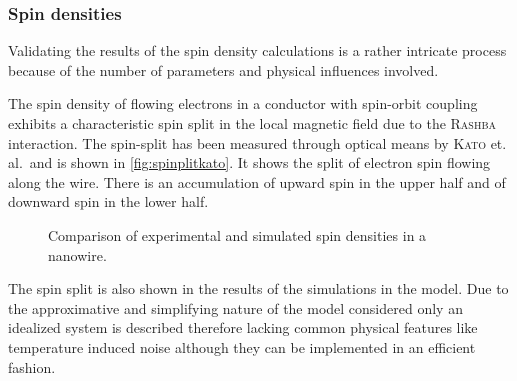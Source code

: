\subsubsection{Spin densities}
Validating the results of the spin density calculations is a rather intricate process because of the number of parameters and physical influences involved.\par
The spin density of flowing electrons in a conductor with spin-orbit coupling exhibits a characteristic spin split in the local magnetic field due to the \textsc{Rashba} interaction. The spin-split has been measured through optical means by \textsc{Kato} et. al.\,\cite{Kato2004Science} and is shown in \cref{fig:spinplitkato}. It shows the split of electron spin flowing along the wire. There is an accumulation of upward spin in the upper half and of downward spin in the lower half.
\begin{figure}[h]
  \begin{center}
    \qquad
    \qquad
    \caption{Comparison of experimental and simulated spin densities in a nanowire.}
  \end{center}
\end{figure}
The spin split is also shown in the results of the simulations in the \gfnc{} model. Due to the approximative and simplifying nature of the model considered only an idealized system is described therefore lacking common physical features like temperature induced noise although they can be implemented in an efficient fashion.\par
\FloatBarrier

